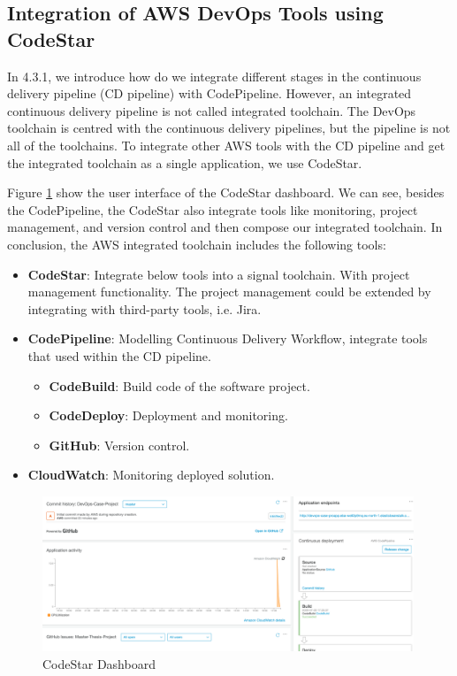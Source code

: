 \subsection{Integration of AWS DevOps Tools using CodeStar}
In 4.3.1, we introduce how do we integrate different stages in the continuous delivery pipeline (CD pipeline) with CodePipeline. However, an integrated continuous delivery pipeline is not called integrated toolchain. The DevOps toolchain is centred with the continuous delivery pipelines, but the pipeline is not all of the toolchains. To integrate other AWS tools with the CD pipeline and get the integrated toolchain as a single application, we use CodeStar.  
\par
Figure \ref{fig:codestar} show the user interface of the CodeStar dashboard. We can see, besides the CodePipeline, the CodeStar also integrate tools like monitoring, project management, and version control and then compose our integrated toolchain. In conclusion, the AWS integrated toolchain includes the following tools:
\begin{itemize}
     \item \textbf{CodeStar}: Integrate below tools into a signal toolchain. With project management functionality. The project management could be extended by integrating with third-party tools, i.e. Jira.
          \item \textbf{CodePipeline}: Modelling Continuous Delivery Workflow, integrate tools that used within the CD pipeline.
          \begin{itemize}
               \item \textbf{CodeBuild}: Build code of the software project.
               \item \textbf{CodeDeploy}: Deployment and monitoring.
               \item \textbf{GitHub}: Version control.
          \end{itemize}
          \item \textbf{CloudWatch}: Monitoring deployed solution.
\end{itemize}
\begin{figure}[h]
     \centering
     \includegraphics[width=0.99\textwidth]{pics/codestar.png}
     \caption{CodeStar Dashboard}
     \label{fig:codestar}
    \end{figure}

